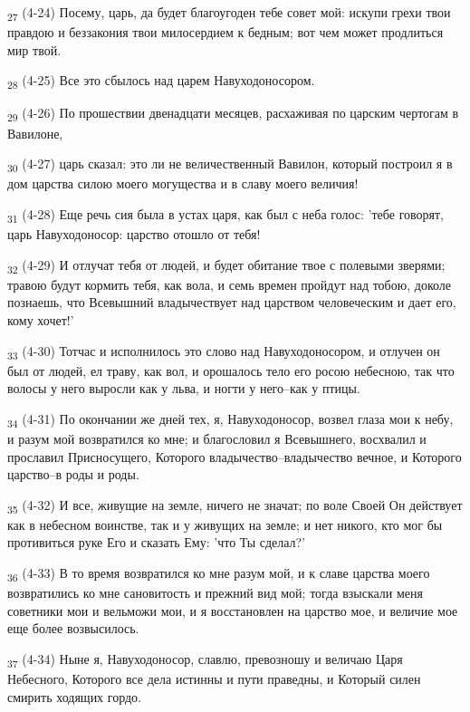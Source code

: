 \begin{tcolorbox}
\textsubscript{27} (4-24) Посему, царь, да будет благоугоден тебе совет мой: искупи грехи твои правдою и беззакония твои милосердием к бедным; вот чем может продлиться мир твой.
\end{tcolorbox}
\begin{tcolorbox}
\textsubscript{28} (4-25) Все это сбылось над царем Навуходоносором.
\end{tcolorbox}
\begin{tcolorbox}
\textsubscript{29} (4-26) По прошествии двенадцати месяцев, расхаживая по царским чертогам в Вавилоне,
\end{tcolorbox}
\begin{tcolorbox}
\textsubscript{30} (4-27) царь сказал: это ли не величественный Вавилон, который построил я в дом царства силою моего могущества и в славу моего величия!
\end{tcolorbox}
\begin{tcolorbox}
\textsubscript{31} (4-28) Еще речь сия была в устах царя, как был с неба голос: 'тебе говорят, царь Навуходоносор: царство отошло от тебя!
\end{tcolorbox}
\begin{tcolorbox}
\textsubscript{32} (4-29) И отлучат тебя от людей, и будет обитание твое с полевыми зверями; травою будут кормить тебя, как вола, и семь времен пройдут над тобою, доколе познаешь, что Всевышний владычествует над царством человеческим и дает его, кому хочет!'
\end{tcolorbox}
\begin{tcolorbox}
\textsubscript{33} (4-30) Тотчас и исполнилось это слово над Навуходоносором, и отлучен он был от людей, ел траву, как вол, и орошалось тело его росою небесною, так что волосы у него выросли как у льва, и ногти у него--как у птицы.
\end{tcolorbox}
\begin{tcolorbox}
\textsubscript{34} (4-31) По окончании же дней тех, я, Навуходоносор, возвел глаза мои к небу, и разум мой возвратился ко мне; и благословил я Всевышнего, восхвалил и прославил Присносущего, Которого владычество--владычество вечное, и Которого царство--в роды и роды.
\end{tcolorbox}
\begin{tcolorbox}
\textsubscript{35} (4-32) И все, живущие на земле, ничего не значат; по воле Своей Он действует как в небесном воинстве, так и у живущих на земле; и нет никого, кто мог бы противиться руке Его и сказать Ему: 'что Ты сделал?'
\end{tcolorbox}
\begin{tcolorbox}
\textsubscript{36} (4-33) В то время возвратился ко мне разум мой, и к славе царства моего возвратились ко мне сановитость и прежний вид мой; тогда взыскали меня советники мои и вельможи мои, и я восстановлен на царство мое, и величие мое еще более возвысилось.
\end{tcolorbox}
\begin{tcolorbox}
\textsubscript{37} (4-34) Ныне я, Навуходоносор, славлю, превозношу и величаю Царя Небесного, Которого все дела истинны и пути праведны, и Который силен смирить ходящих гордо.
\end{tcolorbox}
